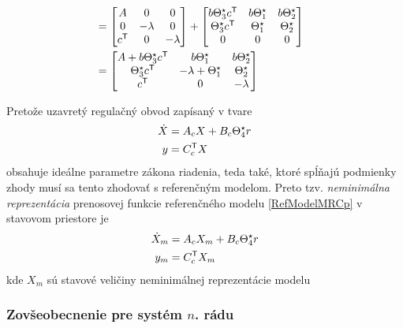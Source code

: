 \documentclass[a4paper, 10pt, ]{article}
\begin{document}
\begin{equation}
\begin{split}
		\\
		&=
		\begin{bmatrix} A & 0 & 0 \\ 0 & -\lambda & 0 \\ c^{\mathsf{T}} & 0 & -\lambda \end{bmatrix}
	 	+
	 	\begin{bmatrix} b \Theta_3^\star c^{\mathsf{T}} & b \Theta_1^\star & b \Theta_2^\star \\ \Theta_3^\star c^{\mathsf{T}} & \Theta_1^\star & \Theta_2^\star \\ 0 & 0 & 0 \end{bmatrix}
		\\
		& =
		\begin{bmatrix} A +  b \Theta_3^\star c^{\mathsf{T}} & b \Theta_1^\star & b \Theta_2^\star \\ \Theta_3^\star c^{\mathsf{T}} & -\lambda + \Theta_1^\star & \Theta_2^\star \\ c^{\mathsf{T}} & 0 & -\lambda \end{bmatrix}
	\end{split}
\end{equation}

Pretože uzavretý regulačný obvod zapísaný v tvare
\begin{subequations} \label{UROaugmentedPlant_02}
	\begin{align}
		\dot X &= A_c X + B_c \Theta_4^\star r \\
		y &= C_c^{\mathsf{T}} X
	\end{align}
\end{subequations}
obsahuje ideálne parametre zákona riadenia, teda také, ktoré spĺňajú podmienky zhody musí sa tento zhodovať s referenčným modelom. Preto tzv. \emph{neminimálna reprezentácia} prenosovej funkcie referenčného modelu \eqref{RefModelMRCp} v stavovom priestore je
\begin{subequations} \label{NeminimalRMMRCp}
	\begin{align}
		\dot X_m &= A_c X_m + B_c \Theta_4^\star r \\
		y_m &= C_c^{\mathsf{T}} X_m
	\end{align}
\end{subequations}
kde $X_m$ sú stavové veličiny neminimálnej reprezentácie modelu










\subsubsection{Zovšeobecnenie pre systém $n$. rádu}
\end{document}
